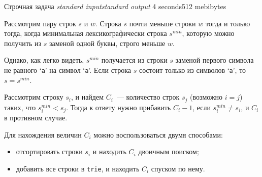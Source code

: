 \begin{problem}{Строчная задача}
{\textsl{standard input}}{\textsl{standard output}}
{4 seconds}{512 mebibytes}{}

Рассмотрим пару строк $s$ и $w$. Строка $s$ почти меньше строки $w$ тогда и только тогда, когда минимальная лексикографически строка $s^{min}$, которую можно получить из $s$ заменой одной буквы, строго меньше $w$. 

Однако, как легко видеть, $s^{min}$ получается из строки $s$ заменой первого символа не равного `\texttt{a}' на символ `\texttt{a}'. Если строка $s$ состоит только из символов `\texttt{a}', то $s = s^{min}$.

Рассмотрим строку $s_i$, и найдем $C_i$~--- количество строк $s_j$ (возможно $i=j$) таких, что $s_i^{min} < s_j$. Тогда к ответу нужно прибавить $C_i - 1$, если $s_i^{min} \ne s_i$, и $C_i$ в противном случае. 

Для нахождения величин $C_i$ можно воспользоваться двумя способами:
\begin{itemize}
\item отсортировать строки $s_i$ и находить $C_i$ двоичным поиском;
\item добавить все строки в \texttt{trie}, и находить $C_i$ спуском по нему.
\end{itemize}

\end{problem}
